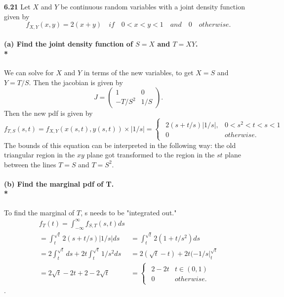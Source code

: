 {\bf 6.21}
Let $X$ and $Y$ be continuous random variables with a joint density function given by 
\begin{equation} f_{X,Y}(x,y)=2(x+y) \quad if \quad 0<x<y<1 \quad and\quad 0 \quad otherwise. \end{equation}
\paragraph{(a) Find the joint density function of $S=X$ and $T=XY$. \\*} 
We can solve for $X$ and $Y$ in terms of the new variables, to get $X=S$ and $Y=T/S$.  Then the jacobian is given by 
\begin{equation} J=\left(
\begin{array}{cc} 1 & 0 \\ -T/S^2 & 1/S \end{array}\right). \end{equation}
Then the new pdf is given by 
\begin{equation} f_{T,S}(s,t)=f_{X,Y}(x(s,t),y(s,t))\times |1/s| = \begin{cases}
\begin{array}{lc} 2(s+t/s)\left|1/s\right|, & 0<s^2<t<s<1 \\ 
0 & otherwise. \end{array} \end{cases} \end{equation}
The bounds of this equation can be interpreted in the following way:  the old triangular region in the $xy$ plane got transformed to the region in the $st$ plane between the lines $T=S$ and $T=S^2$. 
\paragraph{(b) Find the marginal pdf of T. \\*}
To find the marginal of $T$, s needs to be "integrated out." 
\begin{equation}\begin{split}  f_T(t)=\int_{-\infty}^{\infty}f_{S,T}(s,t)ds \\ 
= \int_{t}^{\sqrt{t}}2(s+t/s)\left|1/s\right|ds
&= \int_{t}^{\sqrt{t}}2(1+t/s^2)ds \\
=2\int_{t}^{\sqrt{t}}ds+2t\int_{t}^{\sqrt{t}}1/s^2ds
&=2(\sqrt{t} -t)+2t(-1/s\rvert^{\sqrt{t}}_{t}\\ 
=2\sqrt{t} -2t +2 -2\sqrt{t} &= \begin{cases} \begin{array} {lc} 2-2t & t \in (0,1)\\ 0 & otherwise. \end{array} \end{cases} \end{split} \end{equation}.
